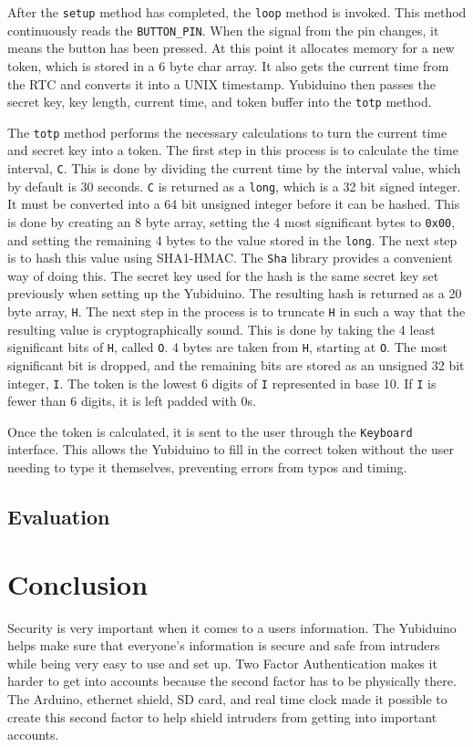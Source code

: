 \documentclass[conference]{IEEEtran}
\begin{document}
After the \texttt{setup} method has completed, the \texttt{loop} method is
invoked.  This method continuously reads the \texttt{BUTTON\_PIN}.  When the
signal from the pin changes, it means the button has been pressed.  At this
point it allocates memory for a new token, which is stored in a 6 byte char
array.  It also gets the current time from the RTC and converts it into a UNIX
timestamp.  Yubiduino then passes the secret key, key length, current time, and
token buffer into the \texttt{totp} method.

The \texttt{totp} method performs the necessary calculations to turn the
current time and secret key into a token.  The first step in this process is to
calculate the time interval, \texttt{C}.  This is done by dividing the current
time by the interval value, which by default is 30 seconds. \texttt{C} is
returned as a \texttt{long}, which is a 32 bit signed integer.  It must be
converted into a 64 bit unsigned integer before it can be hashed.  This is done
by creating an 8 byte array, setting the 4 most significant bytes to
\texttt{0x00}, and setting the remaining 4 bytes to the value stored in the
\texttt{long}.  The next step is to hash this value using SHA1-HMAC.  The
\texttt{Sha} library provides a convenient way of doing this.  The secret key
used for the hash is the same secret key set previously when setting up the
Yubiduino.  The resulting hash is returned as a 20 byte array, \texttt{H}.  The
next step in the process is to truncate \texttt{H} in such a way that the
resulting value is cryptographically sound. This is done by taking the 4 least
significant bits of \texttt{H}, called \texttt{O}.  4 bytes are taken from
\texttt{H}, starting at \texttt{O}.  The most significant bit is dropped, and
the remaining bits are stored as an unsigned 32 bit integer, \texttt{I}.  The
token is the lowest 6 digits of \texttt{I} represented in base 10.  If
\texttt{I} is fewer than 6 digits, it is left padded with 0s.

Once the token is calculated, it is sent to the user through the
\texttt{Keyboard} interface.  This allows the Yubiduino to fill in the correct
token without the user needing to type it themselves, preventing errors from
typos and timing.


\subsection{Evaluation}


\section{Conclusion}
Security is very important when it comes to a users information. The Yubiduino
helps make sure that everyone's information is secure and safe from intruders
while being very easy to use and set up.  Two Factor Authentication makes it
harder to get into accounts because the second factor has to be physically
there.  The Arduino, ethernet shield, SD card, and real time clock made it
possible to create this second factor to help shield intruders from getting
into important accounts.
\end{document}

